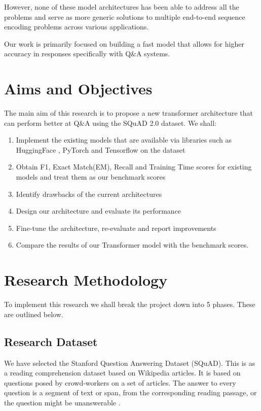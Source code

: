 \documentclass[11pt]{article}
\begin{document}
    However, none of these model architectures has been able to address all the problems and serve as more generic solutions to multiple end-to-end sequence encoding problems across various applications.

    Our work is primarily focused on building a fast model that allows for higher accuracy in responses specifically with Q\&A systems.

	\section{Aims and Objectives}\label{aims}

	The main aim of this research is to propose a new transformer architecture that can perform better at Q\&A using the SQuAD 2.0 dataset.
	We shall:
	\begin{enumerate}
		\item Implement the existing models that are available via libraries such as HuggingFace \citep{hfTransformers}, PyTorch and Tensorflow on the dataset
		\item Obtain F1, Exact Match(EM), Recall and Training Time scores for existing models and treat them as our benchmark scores
		\item Identify drawbacks of the current architectures
		\item Design our architecture and evaluate its performance
		\item Fine-tune the architecture, re-evaluate and report improvements
		\item Compare the results of our Transformer model with the benchmark scores.
	\end{enumerate}

	\section{Research Methodology}\label{researchMeth}

	To implement this research we shall break the project down into 5 phases. These are outlined below.
	\subsection{Research Dataset}\label{datas}

	We have selected the Stanford Question Answering Dataset (SQuAD). This is as a reading comprehension dataset based on Wikipedia articles. It is based on questions posed by crowd-workers on a set of articles. The answer to every question is a segment of text or span, from the corresponding reading passage, or the question might be unanswerable \citep{dataset}.
\end{document}
